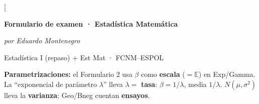 \documentclass[8pt,a4paper,twocolumn]{extarticle}
\newcommand{\E}{\mathbb{E}}
\begin{document}
\twocolumn[\begin{minipage}{\textwidth}\centering
  {\large\bfseries Formulario de examen · Estadística Matemática}\par\vspace{0.5pt}
  {\scriptsize\itshape por Eduardo Montenegro}\par\vspace{0.5pt}
  {\footnotesize Estadística I (repaso) + Est Mat · FCNM–ESPOL}\par
\end{minipage}
\vspace{1.5pt}
{\footnotesize \textbf{Parametrizaciones:} el Formulario 2 usa $\beta$ como \textbf{escala} ($=\E$) en Exp/Gamma. La ``exponencial de parámetro $\lambda$'' lleva $\lambda=$ \textbf{tasa}: $\beta=1/\lambda$, media $1/\lambda$. $N(\mu,\sigma^2)$ lleva la \textbf{varianza}; Geo/Bneg cuentan \textbf{ensayos}.}
\vspace{2pt}
\end{document}
